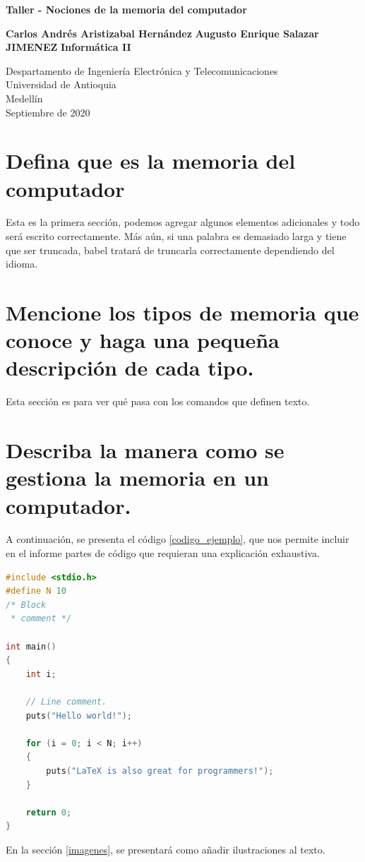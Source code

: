 \documentclass{article}
\begin{document}
\begin{titlepage}
    \begin{center}
        \vspace*{1cm}
            
        \Huge
        \textbf{Taller - Nociones de la memoria del computador}
            
        \vspace{0.5cm}
        \LARGE
            
        \vspace{1.5cm}
            
        \textbf{Carlos Andrés Aristizabal Hernández}
            \textbf{
Augusto Enrique Salazar JIMENEZ }
        \vfill
        \textbf{Informática II} 
        \vspace{0.8cm}
       
        \Large
        Despartamento de Ingeniería Electrónica y Telecomunicaciones\\
        Universidad de Antioquia\\
        Medellín\\
        Septiembre de 2020
            
    \end{center}
\end{titlepage}

\tableofcontents
\newpage
\section{Defina que es la memoria del computador}\label{intro}
Esta es la primera sección, podemos agregar algunos elementos adicionales y todo será escrito correctamente. Más aún, si una palabra es demasiado larga y tiene que ser truncada, babel tratará de truncarla correctamente dependiendo del idioma.

\section{Mencione los tipos de memoria que conoce y haga una pequeña descripción de cada tipo.} \label{contenido}
Esta sección es para ver qué pasa con los comandos que definen texto.

\section{Describa la manera como se gestiona la memoria en un computador.}
%
A continuación, se presenta el código \ref{codigo_ejemplo}, que nos permite incluir en el informe partes de código que requieran una explicación exhaustiva.
\begin{lstlisting}[language=C++, caption=Ejemplo, label=codigo_ejemplo]
#include <stdio.h>
#define N 10
/* Block
 * comment */

int main()
{
    int i;

    // Line comment.
    puts("Hello world!");
    
    for (i = 0; i < N; i++)
    {
        puts("LaTeX is also great for programmers!");
    }

    return 0;
}
\end{lstlisting}
En la sección \ref{imagenes}, se presentará como añadir ilustraciones al texto.
\end{document}
